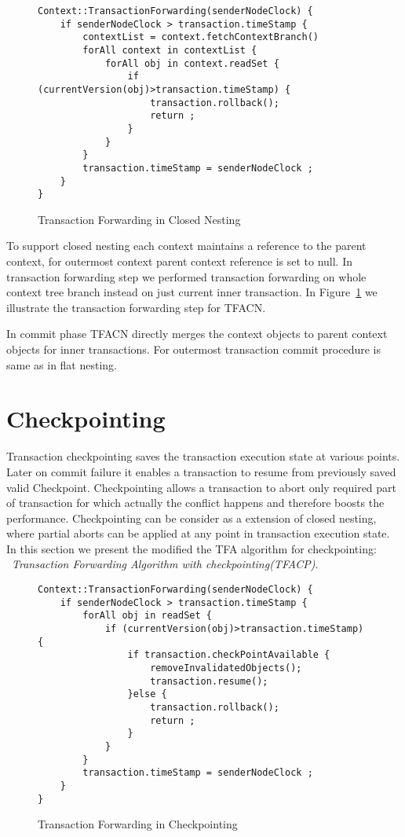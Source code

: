 \documentclass[12pt,english]{report}
\begin{document}
\begin{figure}[H]
\begin{minipage}[b]{0.9\linewidth}\centering
\begin{lstlisting}
Context::TransactionForwarding(senderNodeClock) {
	if senderNodeClock > transaction.timeStamp {
		contextList = context.fetchContextBranch()
		forAll context in contextList {
			forAll obj in context.readSet {
				if (currentVersion(obj)>transaction.timeStamp) { 
					transaction.rollback();
					return ;
				}		
			}
		}
		transaction.timeStamp = senderNodeClock ; 
	}
}
\end{lstlisting}
\end{minipage}
\caption{Transaction Forwarding in Closed Nesting}
\label{Fig:CloseTFA}
\end{figure} 

To support closed nesting each context maintains a reference to the parent context, for outermost context parent context reference is set to null. In transaction forwarding step we performed transaction forwarding on whole context tree branch instead on just current inner transaction. In Figure~\ref{Fig:CloseTFA} we illustrate the transaction forwarding step for TFACN.

In commit phase TFACN directly merges the context objects to parent context objects for inner transactions. For outermost transaction commit procedure is same as in flat nesting. 

\section{Checkpointing}

Transaction checkpointing saves the transaction execution state at various points. Later on commit failure it enables a transaction to resume from previously saved valid Checkpoint. Checkpointing allows a transaction to abort only required part of transaction for which actually the conflict happens and therefore boosts the performance. Checkpointing can be consider as a extension of closed nesting, where partial aborts can be applied at any point in transaction execution state. In this section we present  the modified the TFA algorithm for checkpointing: ~\emph{Transaction Forwarding Algorithm with checkpointing(TFACP)}.

\begin{figure}[H]
\begin{minipage}[b]{0.9\linewidth}\centering
\begin{lstlisting}
Context::TransactionForwarding(senderNodeClock) {
	if senderNodeClock > transaction.timeStamp {
		forAll obj in readSet {
			if (currentVersion(obj)>transaction.timeStamp) { 
				if transaction.checkPointAvailable {
					removeInvalidatedObjects();
					transaction.resume();
				}else {
					transaction.rollback();
					return ;
				}		
			}
		}
		transaction.timeStamp = senderNodeClock ; 
	}
}
\end{lstlisting}
\end{minipage}
\caption{Transaction Forwarding in Checkpointing}
\label{Fig:CheckPointTFA}
\end{figure} 
\end{document}
